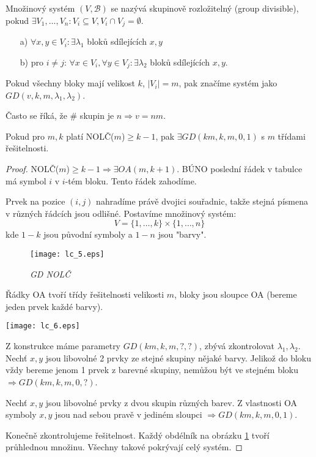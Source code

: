 \begin{definition}
    Množinový systém $(V,\mathcal{B})$ se nazývá skupinově rozložitelný (group divisible), pokud $\exists V_1,\ldots, V_n: V_i\subseteq V, V_i\cap V_j=\emptyset$.
    \begin{itemize}
        \item[a)] $\forall x,y\in V_i: \exists \lambda_1$ bloků sdílejících $x,y$
        \item[b)] pro $i\neq j$: $\forall x\in V_i, \forall y\in V_j: \exists\lambda_2$ bloků sdílejících $x,y$.
    \end{itemize}
    Pokud všechny bloky mají velikost $k$, $|V_i|=m$, pak značíme systém jako $GD(v,k,m,\lambda_1,\lambda_2)$.

	Často se říká, že \# skupin je $n \Rightarrow v = n m$.
\end{definition}
\begin{theorem}
    Pokud pro $m,k$ platí NOLČ($m$)$\geq k-1$, pak $\exists GD(km,k,m,0,1)$ s $m$ třídami řešitelnosti.
\end{theorem}
\begin{proof}
	NOLČ($m$)$\geq k-1 \Rightarrow \exists OA(m, k + 1)$.
	BÚNO poslední řádek v tabulce má symbol $i$ v $i$-tém bloku.
	Tento řádek zahodíme.

	Prvek na pozice $(i, j)$ nahradíme právě dvojici souřadnic, takže stejná písmena v různých řádcích jsou odlišné.
	Postavíme množinový systém:
	\[ V = \{ 1, \ldots, k \} \times \{ 1, \ldots, n \} \]
	kde $1 - k$ jsou původní symboly a $1 - n$ jsou "barvy".

	\begin{figure}
	\texttt{[image: lc\_5.eps]}
	\caption{\small \sl GD NOLČ
	\label{fig:nolc_gd_obr}}
	\end{figure}

	Řádky OA tvoří třídy řešitelnosti velikosti $m$, bloky jsou sloupce OA (bereme jeden prvek každé barvy).

	\texttt{[image: lc\_6.eps]}

	Z konstrukce máme parametry $GD(km,k,m, ?, ?)$, zbývá zkontrolovat $\lambda_1, \lambda_2$.
	Nechť $x, y$ jsou libovolné 2 prvky ze stejné skupiny nějaké barvy.
	Jelikož do bloku vždy bereme jenom 1 prvek z barevné skupiny, nemůžou být ve stejném bloku $\Rightarrow GD(km,k,m, 0, ?)$.

	Nechť $x, y$ jsou libovolné prvky z dvou skupin různých barev.
	Z vlastnosti OA symboly $x, y$ jsou nad sebou pravě v jediném sloupci $\Rightarrow GD(km,k,m, 0, 1)$.

	Konečně zkontrolujeme řešitelnost.
	Každý obdélník na obrázku \cref{fig:nolc_gd_obr} tvoří průhlednou množinu.
	Všechny takové pokrývají celý systém.
\end{proof}
